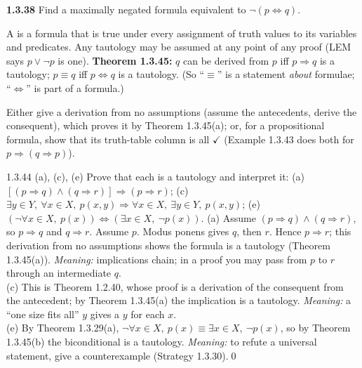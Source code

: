 \begin{trybox}[{1.3.38 \fO}]
\textbf{1.3.38} Find a maximally negated formula equivalent to $\neg(p\Leftrightarrow q)$.
\end{trybox}

\begin{key}
A  is a formula that is true under every assignment of truth values to its variables and predicates. Any tautology may be assumed at any point of any proof (LEM says $p\vee\neg p$ is one). \textbf{Theorem 1.3.45:} $q$ can be derived from $p$ iff $p\Rightarrow q$ is a tautology; $p\equiv q$ iff $p\Leftrightarrow q$ is a tautology. (So ``$\equiv$'' is a statement \emph{about} formulae; ``$\Leftrightarrow$'' is part of a formula.)
\end{key}
\begin{strategy}
Either give a derivation from no assumptions (assume the antecedents, derive the consequent), which proves it by Theorem 1.3.45(a); or, for a propositional formula, show that its truth-table column is all $\checkmark$ (Example 1.3.43 does both for $p\Rightarrow(q\Rightarrow p)$).
\end{strategy}

\begin{bookex}[essential]{1.3.44 (a), (c), (e)}
Prove that each is a tautology and interpret it: (a) $[(p\Rightarrow q)\wedge(q\Rightarrow r)]\Rightarrow(p\Rightarrow r)$; (c) $\exists y\in Y,\ \forall x\in X,\ p(x,y)\Rightarrow\forall x\in X,\ \exists y\in Y,\ p(x,y)$; (e) $(\neg\forall x\in X,\ p(x))\Leftrightarrow(\exists x\in X,\ \neg p(x))$.
\solution
(a) Assume $(p\Rightarrow q)\wedge(q\Rightarrow r)$, so $p\Rightarrow q$ and $q\Rightarrow r$. Assume $p$. Modus ponens gives $q$, then $r$. Hence $p\Rightarrow r$; this derivation from no assumptions shows the formula is a tautology (Theorem 1.3.45(a)). \emph{Meaning:} implications chain; in a proof you may pass from $p$ to $r$ through an intermediate $q$.\\
(c) This is Theorem 1.2.40, whose proof is a derivation of the consequent from the antecedent; by Theorem 1.3.45(a) the implication is a tautology. \emph{Meaning:} a ``one size fits all'' $y$ gives a $y$ for each $x$.\\
(e) By Theorem 1.3.29(a), $\neg\forall x\in X,\ p(x)\equiv\exists x\in X,\ \neg p(x)$, so by Theorem 1.3.45(b) the biconditional is a tautology. \emph{Meaning:} to refute a universal statement, give a counterexample (Strategy 1.3.30).\qed
\end{bookex}

